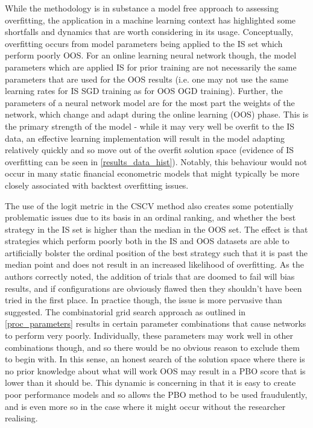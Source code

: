 \documentclass[a4paper,11pt,oneside]{article}
\theoremstyle{plain}
\theoremstyle{definition}
\begin{document}
	\texttt{}\newline
	While the methodology is in substance a model free approach to assessing overfitting, the application in a machine learning context has highlighted some shortfalls and dynamics that are worth considering in its usage. Conceptually, overfitting occurs from model parameters being applied to the IS set which perform poorly OOS. For an online learning neural network though, the model parameters which are applied IS for prior training are not necessarily the same parameters that are used for the OOS results (i.e. one may not use the same learning rates for IS SGD training as for OOS OGD training). Further, the parameters of a neural network model are for the most part the weights of the network, which change and adapt during the online learning (OOS) phase. This is the primary strength of the model - while it may very well be overfit to the IS data, an effective learning implementation will result in the model adapting relatively quickly and so move out of the overfit solution space (evidence of IS overfitting can be seen in \ref{results_data_hist}). Notably, this behaviour would not occur in many static financial econometric models that might typically be more closely associated with backtest overfitting issues.\newline 
	
	The use of the logit metric in the CSCV method also creates some potentially problematic issues due to its basis in an ordinal ranking, and whether the best strategy in the IS set is higher than the median in the OOS set. The effect is that strategies which perform poorly both in the IS and OOS datasets are able to artificially bolster the ordinal position of the best strategy such that it is past the median point and does not result in an increased likelihood of overfitting. As the authors correctly noted, the addition of trials that are doomed to fail will bias results, and if configurations are obviously flawed then they shouldn't have been tried in the first place. In practice though, the issue is more pervasive than suggested. The combinatorial grid search approach as outlined in \ref{proc_parameters} results in certain parameter combinations that cause networks to perform very poorly. Individually, these parameters may work well in other combinations though, and so there would be no obvious reason to exclude them to begin with. In this sense, an honest search of the solution space where there is no prior knowledge about what will work OOS may result in a PBO score that is lower than it should be. This dynamic is concerning in that it is easy to create poor performance models and so allows the PBO method to be used fraudulently, and is even more so in the case where it might occur without the researcher realising. \newline
	
\end{document}
